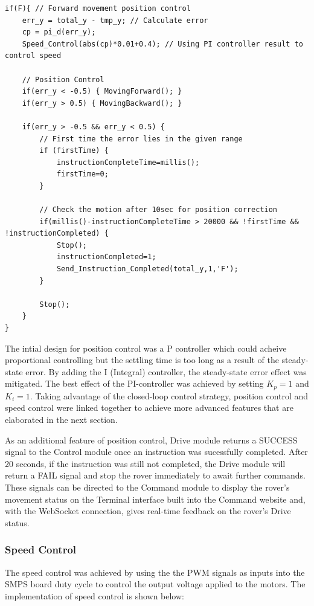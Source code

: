 \documentclass[11pt, a4paper]{article}
\begin{document}
\begin{lstlisting}
if(F){ // Forward movement position control
    err_y = total_y - tmp_y; // Calculate error
    cp = pi_d(err_y);
    Speed_Control(abs(cp)*0.01+0.4); // Using PI controller result to control speed

    // Position Control
    if(err_y < -0.5) { MovingForward(); }
    if(err_y > 0.5) { MovingBackward(); }

    if(err_y > -0.5 && err_y < 0.5) {
        // First time the error lies in the given range
        if (firstTime) {
            instructionCompleteTime=millis();
            firstTime=0; 
        } 

        // Check the motion after 10sec for position correction
        if(millis()-instructionCompleteTime > 20000 && !firstTime && !instructionCompleted) {
            Stop();
            instructionCompleted=1;
            Send_Instruction_Completed(total_y,1,'F');        
        }

        Stop();
    }       
}
\end{lstlisting}

The intial design for position control was a P controller which could acheive proportional controlling but the settling time is too long as a result of the steady-state error. By adding the I (Integral) controller, the steady-state error effect was mitigated. The best effect of the PI-controller was achieved by setting $K_p = 1$ and $K_i = 1$. Taking advantage of the closed-loop control strategy, position control and speed control were linked together to achieve more advanced features that are elaborated in the next section. 

As an additional feature of position control, Drive module returns a SUCCESS signal to the Control module once an instruction was sucessfully completed. After 20 seconds, if the instruction was still not completed, the Drive module will return a FAIL signal and stop the rover immediately to await further commands. These signals can be directed to the Command module to display the rover's movement status on the Terminal interface built into the Command website and, with the WebSocket connection, gives real-time feedback on the rover's Drive status.  

\subsubsection{Speed Control}

The speed control was achieved by using the the PWM signals as inputs into the SMPS board duty cycle to control the output voltage applied to the motors. The implementation of speed control is shown below:
\end{document}
